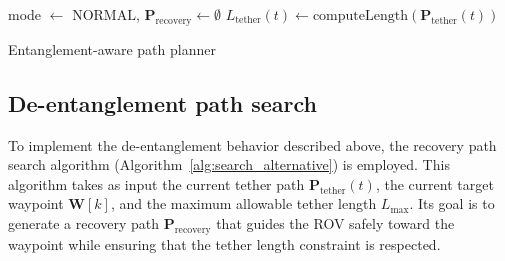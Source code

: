\begin{algorithm}[t]
\LinesNotNumbered  %
\BlankLine
{}
mode $\gets$ $\mathrm{NORMAL}$, 
$\mathbf{P}_{\text{recovery}} \gets \emptyset$ 
\BlankLine
{}
$L_{\text{tether}}(t) \gets \text{computeLength}(\mathbf{P}_{\mathrm{tether}}(t))$\;

\BlankLine
{}

\BlankLine
{}\;

\caption{Entanglement-aware path planner}
\label{alg:main_loop}
\end{algorithm}





\subsection{De-entanglement path search}


To implement the de-entanglement behavior described above, the recovery path search algorithm (Algorithm~\ref{alg:search_alternative}) is employed. This algorithm takes as input the current tether path \(\mathbf{P}_{\mathrm{tether}}(t)\), the current target waypoint \(\mathbf{W}[k]\), and the maximum allowable tether length \(L_{\max}\). Its goal is to generate a recovery path \(\mathbf{P}_{\mathrm{recovery}}\) that guides the \ac{ROV} safely toward the waypoint while ensuring that the tether length constraint is respected.

